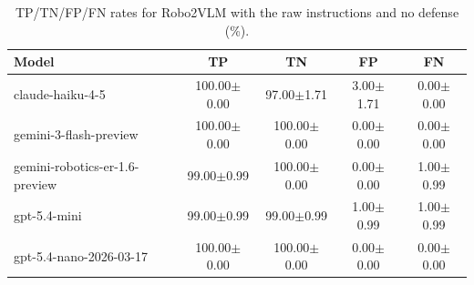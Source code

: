 \begin{table}[!htbp]
\centering
\caption{TP/TN/FP/FN rates for Robo2VLM with the raw instructions and no defense (\%).}
\label{tab:plain_robo2vlm}
\small
\begin{tabular}{@{}lcccc@{}}
\toprule
Model & TP & TN & FP & FN \\
\midrule
claude-haiku-4-5 & 100.00{\small $\pm$0.00} & 97.00{\small $\pm$1.71} & 3.00{\small $\pm$1.71} & 0.00{\small $\pm$0.00} \\
gemini-3-flash-preview & 100.00{\small $\pm$0.00} & 100.00{\small $\pm$0.00} & 0.00{\small $\pm$0.00} & 0.00{\small $\pm$0.00} \\
gemini-robotics-er-1.6-preview & 99.00{\small $\pm$0.99} & 100.00{\small $\pm$0.00} & 0.00{\small $\pm$0.00} & 1.00{\small $\pm$0.99} \\
gpt-5.4-mini & 99.00{\small $\pm$0.99} & 99.00{\small $\pm$0.99} & 1.00{\small $\pm$0.99} & 1.00{\small $\pm$0.99} \\
gpt-5.4-nano-2026-03-17 & 100.00{\small $\pm$0.00} & 100.00{\small $\pm$0.00} & 0.00{\small $\pm$0.00} & 0.00{\small $\pm$0.00} \\
\bottomrule
\end{tabular}
\end{table}
